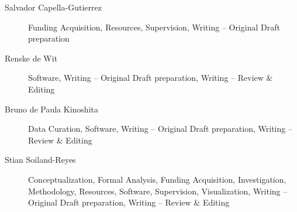\documentclass[10pt,letterpaper]{article}
\begin{document}
\begin{description}
\item[Salvador Capella-Gutierrez]
Funding Acquisition, Resources, Supervision, Writing -- Original Draft preparation
\item[Renske de Wit]
Software, Writing -- Original Draft preparation, Writing -- Review \& Editing
\item[Bruno de Paula Kinoshita]
Data Curation, Software, Writing -- Original Draft preparation, Writing -- Review \& Editing
\item[Stian Soiland-Reyes]
Conceptualization, Formal Analysis, Funding Acquisition, Investigation, Methodology, Resources, Software, Supervision, Visualization, Writing -- Original Draft preparation, Writing -- Review \& Editing
\end{description}

\nolinenumbers
\end{document}

